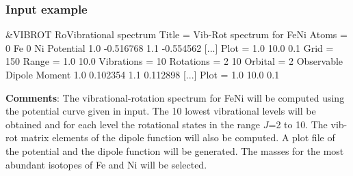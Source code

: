 \subsubsection{Input example}

\begin{inputlisting}
  &VIBROT
RoVibrational spectrum
Title = Vib-Rot spectrum for FeNi
Atoms = 0 Fe 0 Ni
Potential
 1.0 -0.516768
 1.1 -0.554562
 [...]
Plot  = 1.0 10.0 0.1
Grid  = 150
Range = 1.0 10.0
Vibrations = 10
Rotations  = 2 10
Orbital    = 2
Observable
 Dipole Moment
 1.0 0.102354
 1.1 0.112898
 [...]
Plot  = 1.0 10.0 0.1
\end{inputlisting}

{\bf Comments}: The vibrational-{}rotation spectrum for FeNi
will be computed using the potential curve given in input. The 10
lowest vibrational levels will be obtained and for each level the
rotational states in the range $J$=2 to 10. The vib-{}rot matrix elements
of the dipole function will also be computed. A plot file of the
potential and the dipole function will be generated. The masses for
the most abundant isotopes of Fe and Ni will be selected.
